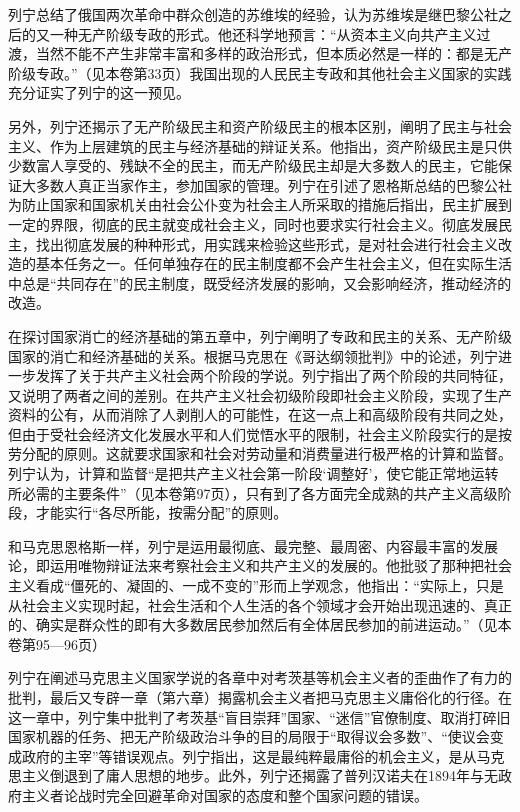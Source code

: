 \documentclass[UTF8, 12pt, a4paper]{ctexrep}
\begin{document}
列宁总结了俄国两次革命中群众创造的苏维埃的经验，认为苏维埃是继巴黎公社之后的又一种无产阶级专政的形式。他还科学地预言：“从资本主义向共产主义过渡，当然不能不产生非常丰富和多样的政治形式，但本质必然是一样的：都是无产阶级专政。”（见本卷第33页）我国出现的人民民主专政和其他社会主义国家的实践充分证实了列宁的这一预见。

另外，列宁还揭示了无产阶级民主和资产阶级民主的根本区别，阐明了民主与社会主义、作为上层建筑的民主与经济基础的辩证关系。他指出，资产阶级民主是只供少数富人享受的、残缺不全的民主，而无产阶级民主却是大多数人的民主，它能保证大多数人真正当家作主，参加国家的管理。列宁在引述了恩格斯总结的巴黎公社为防止国家和国家机关由社会公仆变为社会主人所采取的措施后指出，民主扩展到一定的界限，彻底的民主就变成社会主义，同时也要求实行社会主义。彻底发展民主，找出彻底发展的种种形式，用实践来检验这些形式，是对社会进行社会主义改造的基本任务之一。任何单独存在的民主制度都不会产生社会主义，但在实际生活中总是“共同存在”的民主制度，既受经济发展的影响，又会影响经济，推动经济的改造。

在探讨国家消亡的经济基础的第五章中，列宁阐明了专政和民主的关系、无产阶级国家的消亡和经济基础的关系。根据马克思在《哥达纲领批判》中的论述，列宁进一步发挥了关于共产主义社会两个阶段的学说。列宁指出了两个阶段的共同特征，又说明了两者之间的差别。在共产主义社会初级阶段即社会主义阶段，实现了生产资料的公有，从而消除了人剥削人的可能性，在这一点上和高级阶段有共同之处，但由于受社会经济文化发展水平和人们觉悟水平的限制，社会主义阶段实行的是按劳分配的原则。这就要求国家和社会对劳动量和消费量进行极严格的计算和监督。列宁认为，计算和监督“是把共产主义社会第一阶段‘调整好’，使它能正常地运转所必需的主要条件”（见本卷第97页），只有到了各方面完全成熟的共产主义高级阶段，才能实行“各尽所能，按需分配”的原则。

和马克思恩格斯一样，列宁是运用最彻底、最完整、最周密、内容最丰富的发展论，即运用唯物辩证法来考察社会主义和共产主义的发展的。他批驳了那种把社会主义看成“僵死的、凝固的、一成不变的”形而上学观念，他指出：“实际上，只是从社会主义实现时起，社会生活和个人生活的各个领域才会开始出现迅速的、真正的、确实是群众性的即有大多数居民参加然后有全体居民参加的前进运动。”（见本卷第95—96页）

列宁在阐述马克思主义国家学说的各章中对考茨基等机会主义者的歪曲作了有力的批判，最后又专辟一章（第六章）揭露机会主义者把马克思主义庸俗化的行径。在这一章中，列宁集中批判了考茨基“盲目崇拜”国家、“迷信”官僚制度、取消打碎旧国家机器的任务、把无产阶级政治斗争的目的局限于“取得议会多数”、“使议会变成政府的主宰”等错误观点。列宁指出，这是最纯粹最庸俗的机会主义，是从马克思主义倒退到了庸人思想的地步。此外，列宁还揭露了普列汉诺夫在1894年与无政府主义者论战时完全回避革命对国家的态度和整个国家问题的错误。
\end{document}
